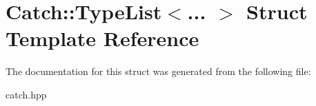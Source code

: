 \hypertarget{structCatch_1_1TypeList}{}\section{Catch\+::Type\+List$<$... $>$ Struct Template Reference}
\label{structCatch_1_1TypeList}


The documentation for this struct was generated from the following file\+:\begin{DoxyCompactItemize}
\item 
catch.\+hpp\end{DoxyCompactItemize}
